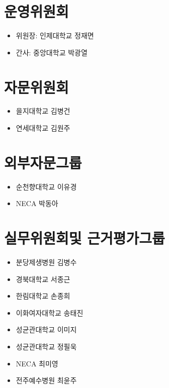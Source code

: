 \documentclass[]{book}
\providecommand{\tightlist}{%
  \setlength{\itemsep}{0pt}\setlength{\parskip}{0pt}}
\begin{document}
\hypertarget{section-30}{%
\section*{운영위원회}\label{section-30}}

\begin{itemize}
\tightlist
\item
  위원장: 인제대학교 정재면
\item
  간사: 중앙대학교 박광열
\end{itemize}

\hypertarget{section-31}{%
\section*{자문위원회}\label{section-31}}

\begin{itemize}
\tightlist
\item
  을지대학교 김병건
\item
  연세대학교 김원주
\end{itemize}

\hypertarget{section-32}{%
\section*{외부자문그룹}\label{section-32}}

\begin{itemize}
\tightlist
\item
  순천향대학교 이유경
\item
  NECA 박동아
\end{itemize}

\hypertarget{section-33}{%
\section*{실무위원회및 근거평가그룹}\label{section-33}}

\begin{itemize}
\tightlist
\item
  분당제생병원 김병수
\item
  경북대학교 서종근
\item
  한림대학교 손종희
\item
  이화여자대학교 송태진
\item
  성균관대학교 이미지
\item
  성균관대학교 정필욱
\item
  NECA 최미영
\item
  전주예수병원 최윤주
\end{itemize}
\end{document}
